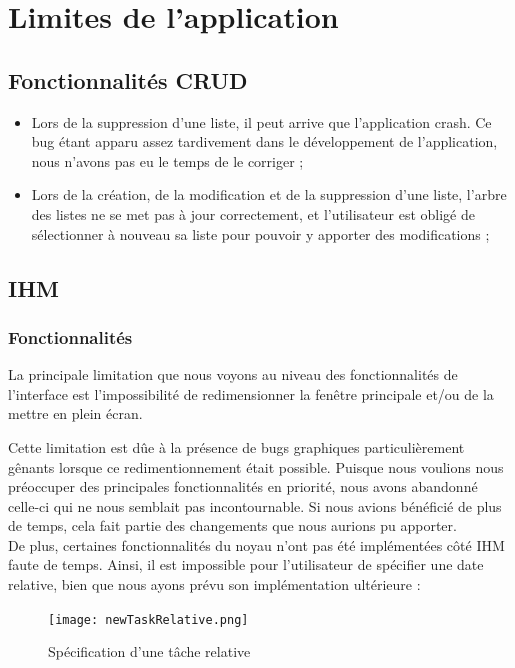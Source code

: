 		
		
	
\chapter{Limites de l'application}
	
	\section{Fonctionnalités CRUD}
	
		\begin{itemize}
			\item Lors de la suppression d'une liste, il peut arrive que l'application crash. Ce bug étant apparu assez tardivement dans le développement de l'application, nous n'avons pas eu le temps de le corriger ;
			\item Lors de la création, de la modification et de la suppression d'une liste, l'arbre des listes ne se met pas à jour correctement, et l'utilisateur est obligé de sélectionner à nouveau sa liste pour pouvoir y apporter des modifications ;
		\end{itemize}
		
		
	\section{IHM}
	
		\subsection{Fonctionnalités}
			La principale limitation que nous voyons au niveau des fonctionnalités de l'interface est l'impossibilité de redimensionner la fenêtre principale et/ou de la mettre en plein écran.
			
			Cette limitation est dûe à la présence de bugs graphiques particulièrement gênants lorsque ce redimentionnement était possible. Puisque nous voulions nous préoccuper des principales fonctionnalités en priorité, nous avons abandonné celle-ci qui ne nous semblait pas incontournable. Si nous avions bénéficié de plus de temps, cela fait partie des changements que nous aurions pu apporter.\\
			
			De plus, certaines fonctionnalités du noyau n'ont pas été implémentées côté IHM faute de temps. Ainsi, il est impossible pour l'utilisateur de spécifier une date relative, bien que nous ayons prévu son implémentation ultérieure :
			\begin{figure}[h!]
				\centering
			   \texttt{[image: newTaskRelative.png]}
			   \caption{Spécification d'une tâche relative}
			\end{figure}
			\FloatBarrier
		
